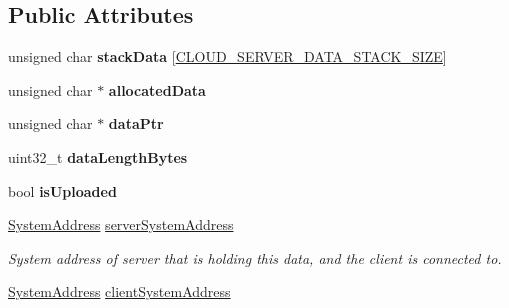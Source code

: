 \subsection*{Public Attributes}
\begin{DoxyCompactItemize}
\item 
\hypertarget{struct_rak_net_1_1_cloud_server_1_1_cloud_data_ad817c6cdb5070a0b47444cdfbb421a33}{unsigned char {\bfseries stack\-Data} \mbox{[}\hyperlink{_cloud_server_8h_a799128390c6c2ded097cf529c752969a}{C\-L\-O\-U\-D\-\_\-\-S\-E\-R\-V\-E\-R\-\_\-\-D\-A\-T\-A\-\_\-\-S\-T\-A\-C\-K\-\_\-\-S\-I\-Z\-E}\mbox{]}}\label{struct_rak_net_1_1_cloud_server_1_1_cloud_data_ad817c6cdb5070a0b47444cdfbb421a33}

\item 
\hypertarget{struct_rak_net_1_1_cloud_server_1_1_cloud_data_a9bbaf94492ed805981a329e3b6d87330}{unsigned char $\ast$ {\bfseries allocated\-Data}}\label{struct_rak_net_1_1_cloud_server_1_1_cloud_data_a9bbaf94492ed805981a329e3b6d87330}

\item 
\hypertarget{struct_rak_net_1_1_cloud_server_1_1_cloud_data_a81e263f002229c443a519c235078b62b}{unsigned char $\ast$ {\bfseries data\-Ptr}}\label{struct_rak_net_1_1_cloud_server_1_1_cloud_data_a81e263f002229c443a519c235078b62b}

\item 
\hypertarget{struct_rak_net_1_1_cloud_server_1_1_cloud_data_a115f78cde347a6ffdfece0b4d41c3ef9}{uint32\-\_\-t {\bfseries data\-Length\-Bytes}}\label{struct_rak_net_1_1_cloud_server_1_1_cloud_data_a115f78cde347a6ffdfece0b4d41c3ef9}

\item 
\hypertarget{struct_rak_net_1_1_cloud_server_1_1_cloud_data_a611a672880d38325f5ac8fc9e0e34abe}{bool {\bfseries is\-Uploaded}}\label{struct_rak_net_1_1_cloud_server_1_1_cloud_data_a611a672880d38325f5ac8fc9e0e34abe}

\item 
\hypertarget{struct_rak_net_1_1_cloud_server_1_1_cloud_data_af43d11e6b7a127c51c0e010b8517665b}{\hyperlink{struct_rak_net_1_1_system_address}{System\-Address} \hyperlink{struct_rak_net_1_1_cloud_server_1_1_cloud_data_af43d11e6b7a127c51c0e010b8517665b}{server\-System\-Address}}\label{struct_rak_net_1_1_cloud_server_1_1_cloud_data_af43d11e6b7a127c51c0e010b8517665b}

\begin{DoxyCompactList}\small\item\em System address of server that is holding this data, and the client is connected to. \end{DoxyCompactList}\item 
\hypertarget{struct_rak_net_1_1_cloud_server_1_1_cloud_data_ac4bc298cca8a8cb93c6617abfe3d37fa}{\hyperlink{struct_rak_net_1_1_system_address}{System\-Address} \hyperlink{struct_rak_net_1_1_cloud_server_1_1_cloud_data_ac4bc298cca8a8cb93c6617abfe3d37fa}{client\-System\-Address}}\label{struct_rak_net_1_1_cloud_server_1_1_cloud_data_ac4bc298cca8a8cb93c6617abfe3d37fa}


\end{DoxyCompactItemize}
